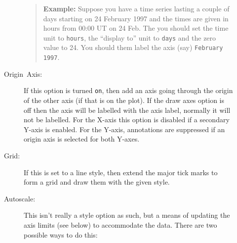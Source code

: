\documentclass[11pt,twoside,english]{article}
\begin{document}
\begin{description}
\begin{description}
\begin{quote}
  \textsf{\textbf{Example:}} \textsf{Suppose you have a time series
    lasting a couple of days starting on 24 February 1997 and the times
    are given in hours from 00:00 UT on 24 Feb. The you should set the
    time unit to} \texttt{hours}\textsf{, the {}``display to'' unit to}
  \texttt{days} \textsf{and the zero value to 24. You should them label
    the axis (say)} \texttt{February 1997}\textsf{.}
\end{quote}
\item [Origin~Axis:]If this option is turned \texttt{on}, then add an
  axis going through the origin of the other axis (if that is on the
  plot). If the draw axes option is off then the axis will be labelled
  with the axis label, normally it will not be labelled. For the X-axis
  this option is disabled if a secondary Y-axis is enabled. For the
  Y-axis, annotations are suppressed if an origin axis is selected for
  both Y-axes.
\item [Grid:]If this is set to a line style, then extend the major tick
  marks to form a grid and draw them with the given style.
\item [Autoscale:]This isn't really a style option as such, but a means
  of updating the axis limits (see below) to accommodate the
  data. There are two possible ways to do this:


\end{description}
\end{description}
\end{document}
